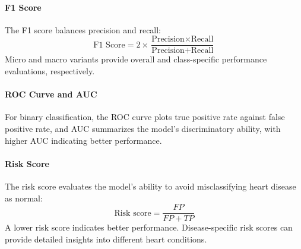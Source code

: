 \paragraph{F1 Score}
The F1 score balances precision and recall:
\[
    \text{F1 Score} = 2 \times \frac{\text{Precision} \times \text{Recall}}{\text{Precision} + \text{Recall}}
\]
Micro and macro variants provide overall and class-specific performance evaluations, respectively.

\paragraph{ROC Curve and AUC}
For binary classification, the ROC curve plots true positive rate against false positive rate, and AUC summarizes the model's discriminatory ability,
 with higher AUC indicating better performance.

\paragraph{Risk Score}
The risk score evaluates the model's ability to avoid misclassifying heart disease as normal:
\[
    \text{Risk score} = \frac{FP}{FP + TP}
\]
A lower risk score indicates better performance. Disease-specific risk scores can provide detailed insights into different heart conditions.